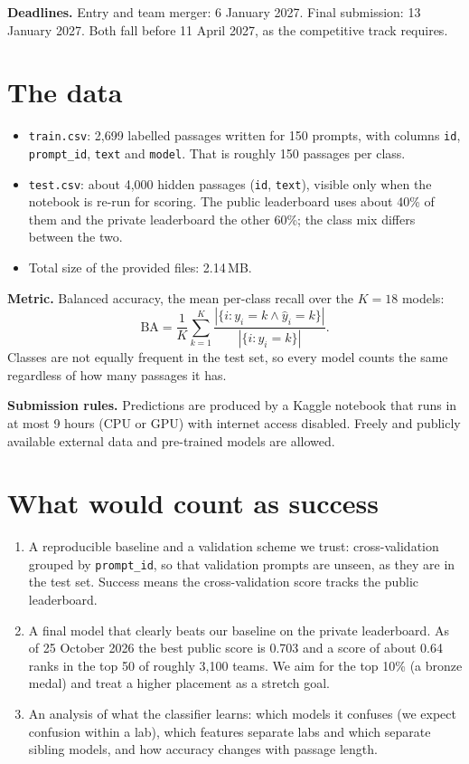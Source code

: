 \documentclass[11pt]{article}
\begin{document}
\textbf{Deadlines.} Entry and team merger: 6 January 2027. Final submission: 13 January 2027.
Both fall before 11 April 2027, as the competitive track requires.

\section*{The data}
\begin{itemize}
  \item \texttt{train.csv}: 2{,}699 labelled passages written for 150 prompts, with columns
        \texttt{id}, \texttt{prompt\_id}, \texttt{text} and \texttt{model}. That is roughly
        150 passages per class.
  \item \texttt{test.csv}: about 4{,}000 hidden passages (\texttt{id}, \texttt{text}), visible only
        when the notebook is re-run for scoring. The public leaderboard uses about 40\% of
        them and the private leaderboard the other 60\%; the class mix differs between the two.
  \item Total size of the provided files: 2.14\,MB.
\end{itemize}

\textbf{Metric.} Balanced accuracy, the mean per-class recall over the $K=18$ models:
\[
  \text{BA} = \frac{1}{K}\sum_{k=1}^{K}
  \frac{\left|\{i : y_i = k \wedge \hat{y}_i = k\}\right|}{\left|\{i : y_i = k\}\right|}.
\]
Classes are not equally frequent in the test set, so every model counts the same regardless of
how many passages it has.

\textbf{Submission rules.} Predictions are produced by a Kaggle notebook that runs in at most
9 hours (CPU or GPU) with internet access disabled. Freely and publicly available external
data and pre-trained models are allowed.

\section*{What would count as success}
\begin{enumerate}
  \item A reproducible baseline and a validation scheme we trust: cross-validation grouped by
        \texttt{prompt\_id}, so that validation prompts are unseen, as they are in the test set.
        Success means the cross-validation score tracks the public leaderboard.
  \item A final model that clearly beats our baseline on the private leaderboard. As of
        25 October 2026 the best public score is 0.703 and a score of about 0.64 ranks in the
        top 50 of roughly 3{,}100 teams. We aim for the top 10\% (a bronze medal) and treat a
        higher placement as a stretch goal.
  \item An analysis of what the classifier learns: which models it confuses (we expect
        confusion within a lab), which features separate labs and which separate sibling
        models, and how accuracy changes with passage length.
\end{enumerate}
\end{document}
